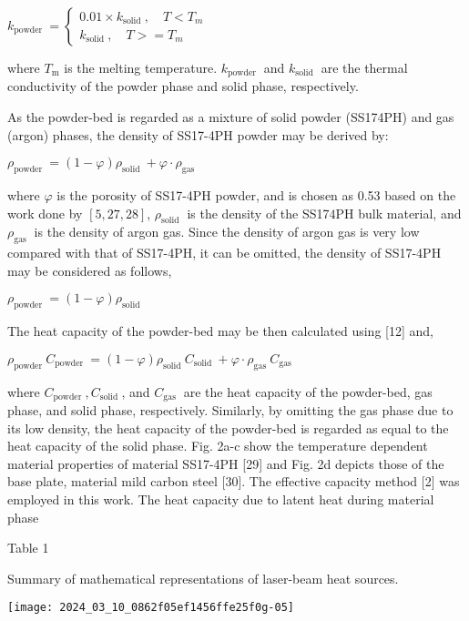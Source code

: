 \documentclass[10pt]{article}
\begin{document}
$k_{\text {powder }}=\left\{\begin{array}{c}0.01 \times k_{\text {solid }}, \quad T<T_{m} \\ k_{\text {solid }}, \quad T>=T_{m}\end{array}\right.$

where $T_{\mathrm{m}}$ is the melting temperature. $k_{\text {powder }}$ and $k_{\text {solid }}$ are the thermal conductivity of the powder phase and solid phase, respectively.

As the powder-bed is regarded as a mixture of solid powder (SS174PH) and gas (argon) phases, the density of SS17-4PH powder may be derived by:

$\rho_{\text {powder }}=(1-\varphi) \rho_{\text {solid }}+\varphi \cdot \rho_{\text {gas }}$

where $\varphi$ is the porosity of SS17-4PH powder, and is chosen as 0.53 based on the work done by $[5,27,28]$, $\rho_{\text {solid }}$ is the density of the SS17$4 \mathrm{PH}$ bulk material, and $\rho_{\text {gas }}$ is the density of argon gas. Since the density of argon gas is very low compared with that of SS17-4PH, it can be omitted, the density of SS17-4PH may be considered as follows,

$\rho_{\text {powder }}=(1-\varphi) \rho_{\text {solid }}$

The heat capacity of the powder-bed may be then calculated using [12] and,

$\rho_{\text {powder }} C_{\text {powder }}=(1-\varphi) \rho_{\text {solid }} C_{\text {solid }}+\varphi \cdot \rho_{\text {gas }} C_{\text {gas }}$

where $C_{\text {powder }}, C_{\text {solid }}$, and $C_{\text {gas }}$ are the heat capacity of the powder-bed, gas phase, and solid phase, respectively. Similarly, by omitting the gas phase due to its low density, the heat capacity of the powder-bed is regarded as equal to the heat capacity of the solid phase. Fig. 2a-c show the temperature dependent material properties of material SS17-4PH [29] and Fig. 2d depicts those of the base plate, material mild carbon steel [30]. The effective capacity method [2] was employed in this work. The heat capacity due to latent heat during material phase

Table 1

Summary of mathematical representations of laser-beam heat sources.

\begin{center}
\texttt{[image: 2024\_03\_10\_0862f05ef1456ffe25f0g-05]}
\end{center}
\end{document}
